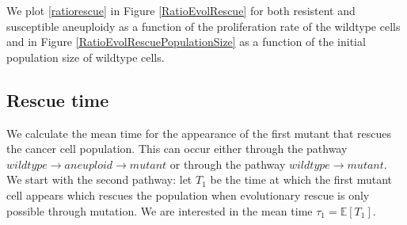 \documentclass[12pt]{extarticle}
\begin{document}
We plot \eqref{ratiorescue} in Figure \ref{RatioEvolRescue} for both resistent and susceptible aneuploidy as a function of the proliferation rate of the wildtype cells and in Figure \ref{RatioEvolRescuePopulationSize} as a function of the initial population size of wildtype cells.


\subsection*{Rescue time}
We calculate the mean time for the appearance of the first mutant that rescues the cancer cell population. This can occur either through the pathway $wildtype\rightarrow aneuploid \rightarrow mutant$ or through the pathway $wildtype \rightarrow mutant$. We start with the second pathway: let $T_1$ be the time at which the first mutant cell appears which rescues the population when evolutionary rescue is only possible through mutation. We are interested in the mean time $\tau_1=\mathbb{E}\left[T_1\right]$.

\end{document}
